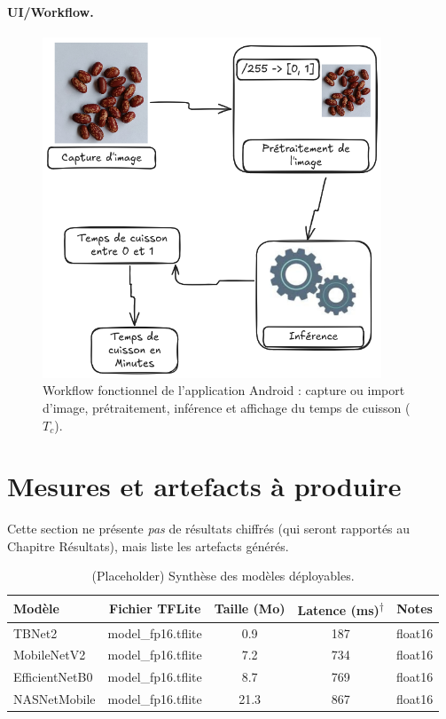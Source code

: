 \paragraph{UI/Workflow.}
\begin{figure}[H]
	\centering
	\includegraphics[width=0.9\textwidth]{figures/workflow.png}
	\caption{Workflow fonctionnel de l’application Android : capture ou import d’image, prétraitement, inférence et affichage du temps de cuisson (\(T_c\)).}
	\label{fig:app_workflow}
\end{figure}

\section{Mesures et artefacts à produire}
\label{sec:mesures_artefacts}

Cette section ne présente \emph{pas} de résultats chiffrés (qui seront rapportés au Chapitre Résultats), mais liste les artefacts générés.

\begin{table}[h!]
	\centering
	\caption{(Placeholder) Synthèse des modèles déployables.}
	\label{tab:deploy_synthese}
	\begin{tabular}{@{}lcccc@{}}
		\toprule
		Modèle         & Fichier TFLite     & Taille (Mo) & Latence (ms)\textsuperscript{$\dagger$} & Notes   \\ \midrule
		TBNet2         & model\_fp16.tflite & 0.9         & 187                                     & float16 \\
		MobileNetV2    & model\_fp16.tflite & 7.2         & 734                                     & float16 \\
		EfficientNetB0 & model\_fp16.tflite & 8.7         & 769                                     & float16 \\
		NASNetMobile   & model\_fp16.tflite & 21.3        & 867                                     & float16 \\ \bottomrule
	\end{tabular}
\end{table}

